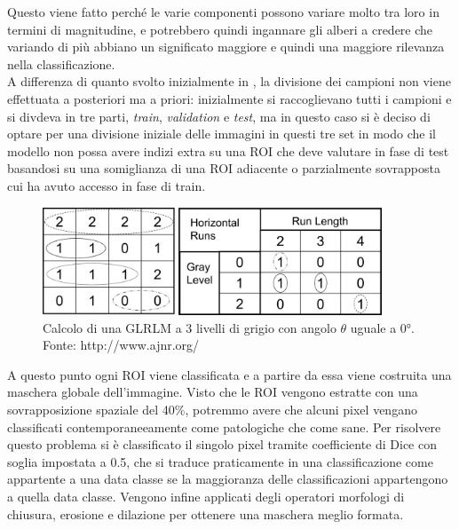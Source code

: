Questo viene fatto perché le varie componenti possono variare molto tra loro
in termini di magnitudine, e potrebbero quindi ingannare gli alberi
a credere che variando di più abbiano un significato maggiore e quindi una
maggiore rilevanza nella classificazione.\\
A differenza di quanto svolto inizialmente in \cite{Toma2022}, la divisione
dei campioni non viene effettuata a posteriori ma a priori:
inizialmente si raccoglievano tutti i campioni e si divdeva in tre parti,
{\it train}, {\it validation} e {\it test}, ma in questo caso si è deciso di optare
per una divisione iniziale delle immagini in questi tre set in modo che
il modello non possa avere indizi extra su una ROI che deve valutare
in fase di test basandosi su una somiglianza di una ROI adiacente o 
parzialmente sovrapposta cui ha avuto accesso in fase di train.

\begin{figure}[h]
    \center
    \includegraphics[width=0.9\textwidth]{./assets/glrlm.jpg}
    \caption{\label{fig:glrlm}Calcolo di una GLRLM a 3 livelli di grigio con angolo $\theta$ uguale a 0°. Fonte: http://www.ajnr.org/}
\end{figure}

A questo punto ogni ROI viene classificata e a partire da essa viene
costruita una maschera globale dell'immagine.
Visto che le ROI vengono estratte con una sovrapposizione spaziale del 40\%,
potremmo avere che alcuni pixel vengano classificati contemporaneeamente
come patologiche che come sane.
Per risolvere questo problema si è classificato il singolo pixel tramite
coefficiente di Dice con soglia impostata a 0.5, che si traduce
praticamente in una classificazione come appartente a una data classe
se la maggioranza delle classificazioni appartengono a quella data classe.
Vengono infine applicati degli operatori morfologi di chiusura, erosione e dilazione
per ottenere una maschera meglio formata.

